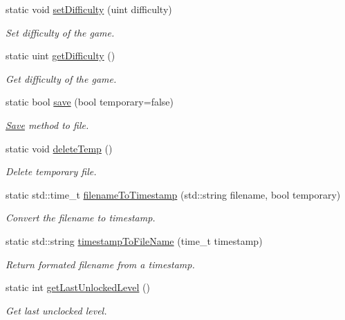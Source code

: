 \begin{DoxyCompactItemize}
static void \hyperlink{class_save_ae4305a76f306f9d7ca5991c881d7c98b}{set\+Difficulty} (uint difficulty)
\begin{DoxyCompactList}\small\item\em Set difficulty of the game. \end{DoxyCompactList}\item 
static uint \hyperlink{class_save_acc628465cba884e99fea348066c1eec9}{get\+Difficulty} ()
\begin{DoxyCompactList}\small\item\em Get difficulty of the game. \end{DoxyCompactList}\item 
static bool \hyperlink{class_save_a2edbb08ba5ec1f0e9291d246580bd295}{save} (bool temporary=false)
\begin{DoxyCompactList}\small\item\em \hyperlink{class_save}{Save} method to file. \end{DoxyCompactList}\item 
\mbox{\label{class_save_a1e4c91355cf5b8e6ee29734f619a20a5}} 
static void \hyperlink{class_save_a1e4c91355cf5b8e6ee29734f619a20a5}{delete\+Temp} ()
\begin{DoxyCompactList}\small\item\em Delete temporary file. \end{DoxyCompactList}\item 
static std\+::time\+\_\+t \hyperlink{class_save_af0cd86308d28ff115d3588369baa529a}{filename\+To\+Timestamp} (std\+::string filename, bool temporary)
\begin{DoxyCompactList}\small\item\em Convert the filename to timestamp. \end{DoxyCompactList}\item 
static std\+::string \hyperlink{class_save_af787535a55af6b09cd0834a979661120}{timestamp\+To\+File\+Name} (time\+\_\+t timestamp)
\begin{DoxyCompactList}\small\item\em Return formated filename from a timestamp. \end{DoxyCompactList}\item 
static int \hyperlink{class_save_aa772c37949dfc374249fdaf4016be3a6}{get\+Last\+Unlocked\+Level} ()
\begin{DoxyCompactList}\small\item\em Get last unclocked level. \end{DoxyCompactList}\end{DoxyCompactItemize}
